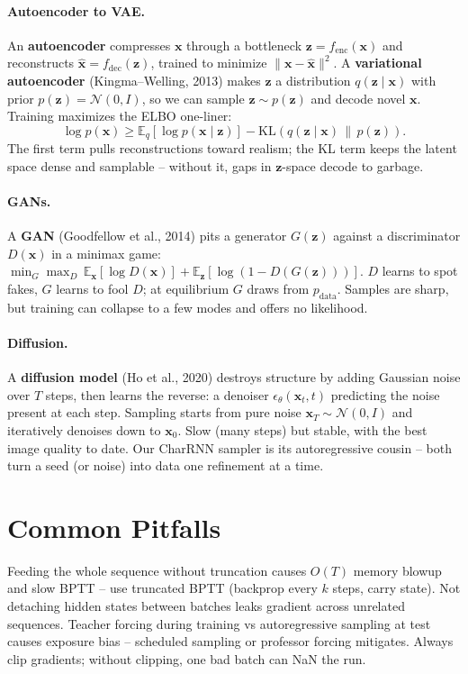 \paragraph{Autoencoder to VAE.} An \textbf{autoencoder} compresses $\mathbf{x}$ through a bottleneck $\mathbf{z}=f_{\mathrm{enc}}(\mathbf{x})$ and reconstructs $\hat{\mathbf{x}}=f_{\mathrm{dec}}(\mathbf{z})$, trained to minimize $\|\mathbf{x}-\hat{\mathbf{x}}\|^2$. A \textbf{variational autoencoder} (Kingma--Welling, 2013) makes $\mathbf{z}$ a distribution $q(\mathbf{z}\mid\mathbf{x})$ with prior $p(\mathbf{z})=\mathcal{N}(0,I)$, so we can sample $\mathbf{z}\sim p(\mathbf{z})$ and decode novel $\mathbf{x}$. Training maximizes the ELBO one-liner:
\begin{equation}
\log p(\mathbf{x})\geq \mathbb{E}_{q}[\log p(\mathbf{x}\mid\mathbf{z})]-\mathrm{KL}(q(\mathbf{z}\mid\mathbf{x})\,\|\,p(\mathbf{z})).
\label{eq:elbo}
\end{equation}
The first term pulls reconstructions toward realism; the KL term keeps the latent space dense and samplable -- without it, gaps in $\mathbf{z}$-space decode to garbage.
\paragraph{GANs.} A \textbf{GAN} (Goodfellow et al., 2014) pits a generator $G(\mathbf{z})$ against a discriminator $D(\mathbf{x})$ in a minimax game: $\min_G\max_D\,\mathbb{E}_{\mathbf{x}}[\log D(\mathbf{x})]+\mathbb{E}_{\mathbf{z}}[\log(1-D(G(\mathbf{z})))]$. $D$ learns to spot fakes, $G$ learns to fool $D$; at equilibrium $G$ draws from $p_{\mathrm{data}}$. Samples are sharp, but training can collapse to a few modes and offers no likelihood.
\paragraph{Diffusion.} A \textbf{diffusion model} (Ho et al., 2020) destroys structure by adding Gaussian noise over $T$ steps, then learns the reverse: a denoiser $\epsilon_\theta(\mathbf{x}_t,t)$ predicting the noise present at each step. Sampling starts from pure noise $\mathbf{x}_T\sim\mathcal{N}(0,I)$ and iteratively denoises down to $\mathbf{x}_0$. Slow (many steps) but stable, with the best image quality to date. Our CharRNN sampler is its autoregressive cousin -- both turn a seed (or noise) into data one refinement at a time.

\section{Common Pitfalls}
Feeding the whole sequence without truncation causes $O(T)$ memory blowup and
slow BPTT -- use truncated BPTT (backprop every $k$ steps, carry state). Not
detaching hidden states between batches leaks gradient across unrelated
sequences. Teacher forcing during training vs autoregressive sampling at test
causes exposure bias -- scheduled sampling or professor forcing mitigates.
Always clip gradients; without clipping, one bad batch can NaN the run.

